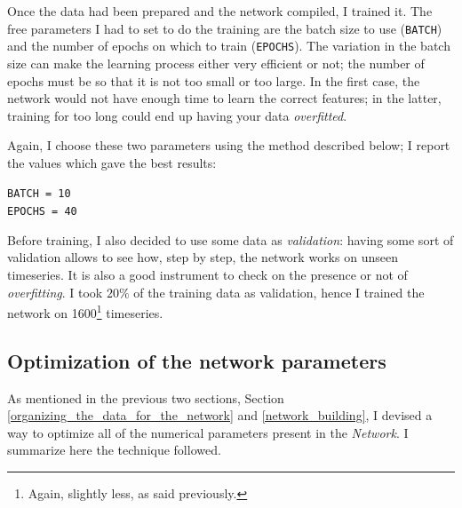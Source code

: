 \documentclass[12pt,a4paper,final]{book}			%
\begin{document}
			Once the data had been prepared and the network compiled, I trained it. The free parameters I had to set to do the training are the batch size to use (\texttt{BATCH}) and the number of epochs on which to train (\texttt{EPOCHS}). The variation in the batch size can make the learning process either very efficient or not; the number of epochs must be so that it is not too small or too large. In the first case, the network would not have enough time to learn the correct features; in the latter, training for too long could end up having your data \textit{overfitted}. 			
			
			Again, I choose these two parameters using the method described below; I report the values which gave the best results:
			\begin{center}
				\texttt{BATCH = 10}\\
				\texttt{EPOCHS = 40}
			\end{center}
			Before training, I also decided to use some data as \textit{validation}:  having some sort of validation allows to see how, step by step, the network works on unseen timeseries. It is also a good instrument to check on the presence or not of \textit{overfitting}. I took $20\%$ of the training data as validation, hence I trained the network on 1600\footnote{Again, slightly less, as said previously.} timeseries.
			
			\subsection{Optimization of the network parameters}\label{optimization_of_the_network_parameters}
			
				As mentioned in the previous two sections, Section \ref{organizing_the_data_for_the_network} and \ref{network_building}, I devised a way to optimize all of the numerical parameters present in the \textit{Network}. I summarize here the technique  followed. 				
				
\end{document}

